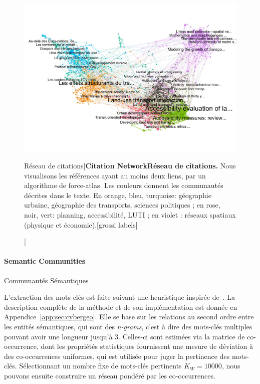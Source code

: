 \begin{figure}[!ht]
\includegraphics[width=\linewidth]{Figures/Final/2-2-2-fig-quantepistemo-citnw.jpg}
\caption[Citation Network][Réseau de citations]{\textbf{Citation Network}\label{fig:quantepistemo:citnw}}{\textbf{Réseau de citations.} Nous visualisons les références ayant au moins deux liens, par un algorithme de force-atlas. Les couleurs donnent les communautés décrites dans le texte. En orange, bleu, turquoise: géographie urbaine, géographie des transports, sciences politiques ; en rose, noir, vert: planning, accessibilité, LUTI ; en violet : réseaux spatiaux (physique et économie).[grossi labels]\label{fig:quantepistemo:citnw}}
\end{figure}





\paragraph{Semantic Communities}{Communautés Sémantiques}


L'extraction des mots-clés est faite suivant une heuristique inspirée de~\cite{chavalarias2013phylomemetic}. La description complète de la méthode et de son implémentation est donnée en Appendice~\ref{app:sec:cybergeo}. Elle se base sur les relations au second ordre entre les entités sémantiques, qui sont des \emph{n-grams}, c'est à dire des mots-clés multiples pouvant avoir une longueur jusqu'à 3. Celles-ci sont estimées via la matrice de co-occurrence, dont les propriétés statistiques fournissent une mesure de déviation à des co-occurrences uniformes, qui est utilisée pour juger la pertinence des mots-clés. Sélectionnant un nombre fixe de mots-clés pertinents $K_W = 10000$, nous pouvons ensuite construire un réseau pondéré par les co-occurrences.


